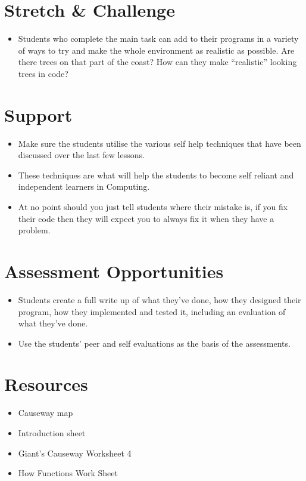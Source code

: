 \documentclass{geocraft-lesson-plan}
\begin{document}
\section*{Stretch \& Challenge}
\begin{itemize}
\item Students who complete the main task can add to their programs in a variety of ways to try and make the whole
  environment as realistic as possible. Are there trees on that part of the coast? How can they make ``realistic''
  looking trees in code?
\end{itemize}

\section*{Support}
\begin{itemize}
\item Make sure the students utilise the various self help techniques that have been discussed over the last few
  lessons. 
\item These techniques are what will help the students to become self reliant and independent learners in Computing. 
\item At no point should you just tell students where their mistake is, if you fix their code then they will expect you
  to always fix it when they have a problem.
\end{itemize}

\section*{Assessment Opportunities}
\begin{itemize}
\item Students create a full write up of what they've done, how they designed their program, how they implemented and
  tested it, including an evaluation of what they've done.
\item Use the students' peer and self evaluations as the basis of the assessments.
\end{itemize}

\section*{Resources}
\begin{itemize}
\item Causeway map
\item Introduction sheet 
\item Giant’s Causeway Worksheet 4
\item How Functions Work Sheet
\end{itemize}
\end{document}
